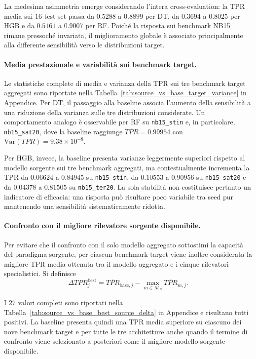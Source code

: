 La medesima asimmetria emerge considerando l'intera cross-evaluation: la TPR media sui $16$ test set passa da $0.5288$ a $0.8899$ per DT, da $0.3694$ a $0.8025$ per HGB e da $0.5161$ a $0.9007$ per RF. 
Poiché la risposta sui benchmark NB15 rimane pressoché invariata, il miglioramento globale è associato principalmente alla differente sensibilità verso le distribuzioni target.

\paragraph{Media prestazionale e variabilità sui benchmark target.}
Le statistiche complete di media e varianza della TPR sui tre benchmark target aggregati sono riportate nella Tabella~\ref{tab:source_vs_base_target_variance} in Appendice. 
Per DT, il passaggio alla baseline associa l'aumento della sensibilità a una riduzione della varianza sulle tre distribuzioni considerate. 
Un comportamento analogo è osservabile per RF su \texttt{nb15\_stin} e, in particolare, \texttt{nb15\_sat20}, dove la baseline raggiunge $\overline{TPR}=0.99954$ con $\mathrm{Var}(TPR)=9.38\times10^{-8}$.

Per HGB, invece, la baseline presenta varianze leggermente superiori rispetto al modello sorgente sui tre benchmark aggregati, ma contestualmente incrementa la TPR da $0.06624$ a $0.84945$ su \texttt{nb15\_stin}, da $0.10553$ a $0.90956$ su \texttt{nb15\_sat20} e da $0.04378$ a $0.81505$ su \texttt{nb15\_ter20}. 
La sola stabilità non costituisce pertanto un indicatore di efficacia: una risposta può risultare poco variabile tra seed pur mantenendo una sensibilità sistematicamente ridotta.

\paragraph{Confronto con il migliore rilevatore sorgente disponibile.}
Per evitare che il confronto con il solo modello aggregato sottostimi la capacità del paradigma sorgente, per ciascun benchmark target viene inoltre considerata la migliore TPR media ottenuta tra il modello aggregato e i cinque rilevatori specialistici. 
Si definisce
\begin{equation}
    \Delta TPR^{\mathrm{best}}_j =
    \overline{TPR}_{\mathrm{base},j}
    -
    \max_{m\in\mathcal{M}_{S}}
    \overline{TPR}_{m,j}.
    \label{eq:delta_tpr_best_source_baseline}
\end{equation}

I $27$ valori completi sono riportati nella Tabella~\ref{tab:source_vs_base_best_source_delta} in Appendice e risultano tutti positivi. 
La baseline presenta quindi una TPR media superiore su ciascuno dei nove benchmark target e per tutte le tre architetture anche quando il termine di confronto viene selezionato a posteriori come il migliore modello sorgente disponibile.

